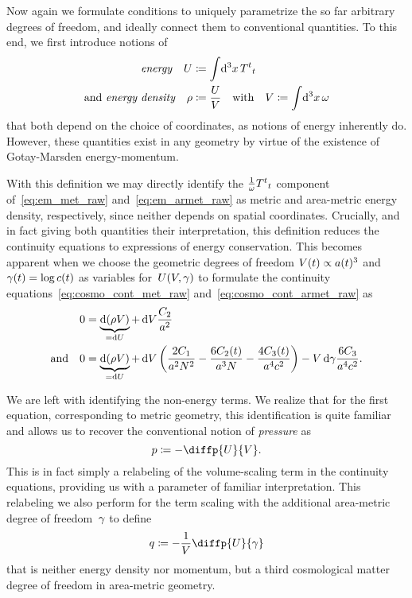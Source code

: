 Now again we formulate conditions to uniquely parametrize the so far arbitrary degrees of freedom, and ideally connect them to conventional quantities. To this end, we first introduce notions of
\begin{align}
	\text{\emph{energy}} \quad \internen&\defeq\intd{^3\coordx}{\EMt^t}_t\\
	\text{and \emph{energy density}} \quad \dens&\defeq\frac{\internen}{\vol} \quad \text{with} \quad \vol\defeq\intd{^3\coordx}\volel
\end{align}
that both depend on the choice of coordinates, as notions of energy inherently do. However, these quantities exist in any geometry by virtue of the existence of Gotay-Marsden energy-momentum.

With this definition we may directly identify the $\frac{1}{\omega}{T^t}_t$ component of~\eqref{eq:em_met_raw} and~\eqref{eq:em_armet_raw} as metric and area-metric energy density, respectively, since neither depends on spatial coordinates. Crucially, and in fact giving both quantities their interpretation, this definition reduces the continuity equations to expressions of energy conservation. This becomes apparent when we choose the geometric degrees of freedom ${V(t)\propto a(t)^3}$ and ${\gamma(t)=\log{c(t)}}$ as variables for~$U(V,\gamma)$ to formulate the continuity equations~\eqref{eq:cosmo_cont_met_raw} and~\eqref{eq:cosmo_cont_armet_raw} as
\begin{align}
	0&=\underbrace{
		\dif{\left(\dens\vol\right)}
	}_{
		=\dif{\internen}
	}+\dif{\vol}\frac{\Const_2}{\scalea^2}\label{eq:cosmo_cont_met_withdens}\\
	\text{and} \quad 0&=\underbrace{
		\dif{\left(\dens\vol\right)}
	}_{
		=\dif{\internen}
	}+\dif{\vol}\left(\frac{2\Const_1}{\scalea^2\Nlapse^2}-\frac{6\Const_2\oft}{\scalea^3\Nlapse}-\frac{4\Const_3\oft}{\scalea^4\scalec^2}\right)-\vol\dif{\lnc}\frac{6\Const_3}{\scalea^4\scalec^2}\label{eq:cosmo_cont_armet_withdens}
	\eqpunct{.}
\end{align}


We are left with identifying the non-energy terms. We realize that for the first equation, corresponding to metric geometry, this identification is quite familiar and allows us to recover the conventional notion of \emph{pressure} as
\begin{equation}
	\press\defeq-\diffp{\internen}{\vol}
	\eqpunct{.}
\end{equation}
This is in fact simply a relabeling of the volume-scaling term in the continuity equations, providing us with a parameter of familiar interpretation. This relabeling we also perform for the term scaling with the additional area-metric degree of freedom~$\gamma$ to define
\begin{equation}\label{eq:q_def}
	\q\defeq-\frac{1}{\vol}\diffp{\internen}{\lnc}
\end{equation}
that is neither energy density nor momentum, but a third cosmological matter degree of freedom in area-metric geometry.

